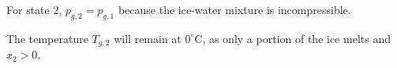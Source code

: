 For state 2, \( p_{g,2} = p_{g,1} \) because the ice-water mixture is incompressible.  

The temperature \( T_{g,2} \) will remain at \( 0^\circ\text{C} \), as only a portion of the ice melts and \( x_2 > 0 \).
